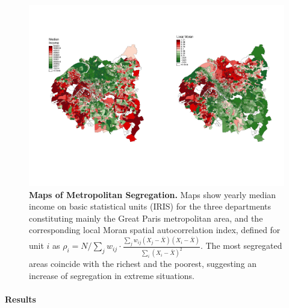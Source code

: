 \documentclass[runningheads,a4paper]{llncs2e/llncs}
\begin{document}
\begin{figure}[h!]
\centering
\hspace{-3cm}\includegraphics[width=1.2\textwidth]{figures/grandParis_income_moran}
\vspace{-2.5cm}
\caption{\textbf{Maps of Metropolitan Segregation.} Maps show yearly median income on basic statistical units (IRIS) for the three departments constituting mainly the Great Paris metropolitan area, and the corresponding local Moran spatial autocorrelation index, defined for unit $i$ as $\rho_i = N/\sum_{j}w_{ij} \cdot \frac{\sum_{j} w_{ij} (X_j - \bar{X})(X_i - \bar{X})}{\sum_i (X_i - \bar{X})^2}$. The most segregated areas coincide with the richest and the poorest, suggesting an increase of segregation in extreme situations.}
\end{figure}

\paragraph{Results}
\end{document}
